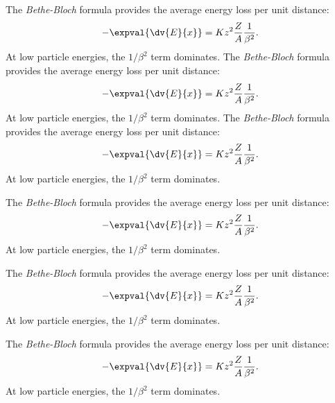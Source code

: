 The \emph{Bethe-Bloch} formula provides the average energy loss per unit distance:
\begin{align}
-\expval{\dv{E}{x}} = K z^2 \frac{Z}{A} \frac{1}{\beta^{2}}.
\end{align}
At low particle energies, the $1/\beta^2$ term dominates.
The \emph{Bethe-Bloch} formula provides the average energy loss per unit distance:
\begin{align}
-\expval{\dv{E}{x}} = K z^2 \frac{Z}{A} \frac{1}{\beta^{2}}.
\end{align}
At low particle energies, the $1/\beta^2$ term dominates.
The \emph{Bethe-Bloch} formula provides the average energy loss per unit distance:
\begin{align}
-\expval{\dv{E}{x}} = K z^2 \frac{Z}{A} \frac{1}{\beta^{2}}.
\end{align}
At low particle energies, the $1/\beta^2$ term dominates.
\begin{frame}[t]
The \emph{Bethe-Bloch} formula provides the average energy loss per unit distance:
\begin{align}
-\expval{\dv{E}{x}} = K z^2 \frac{Z}{A} \frac{1}{\beta^{2}}.
\end{align}
At low particle energies, the $1/\beta^2$ term dominates.
\end{frame}

\begin{frame}[t]
The \emph{Bethe-Bloch} formula provides the average energy loss per unit distance:
\begin{align}
-\expval{\dv{E}{x}} = K z^2 \frac{Z}{A} \frac{1}{\beta^{2}}.
\end{align}
At low particle energies, the $1/\beta^2$ term dominates.
\end{frame}

\begin{frame}[t]
The \emph{Bethe-Bloch} formula provides the average energy loss per unit distance:
\begin{align}
-\expval{\dv{E}{x}} = K z^2 \frac{Z}{A} \frac{1}{\beta^{2}}.
\end{align}
At low particle energies, the $1/\beta^2$ term dominates.
\end{frame}

